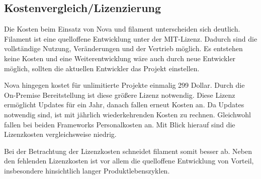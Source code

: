 \subsection{Kostenvergleich/Lizenzierung}
Die Kosten beim Einsatz von Nova und filament unterscheiden sich deutlich.
Filament ist eine quelloffene Entwicklung unter der MIT-Lizenz.
Dadurch sind die vollständige Nutzung, Veränderungen und der Vertrieb möglich.
Es entstehen keine Kosten und eine Weiterentwicklung wäre auch durch neue Entwickler möglich, sollten die aktuellen Entwickler das Projekt einstellen.

Nova hingegen kostet für unlimitierte Projekte einmalig 299 Dollar.
Durch die On-Premise Bereitstellung ist diese größere Lizenz notwendig.
Diese Lizenz ermöglicht Updates für ein Jahr, danach fallen erneut Kosten an.
Da Updates notwendig sind, ist mit jährlich wiederkehrenden Kosten zu rechnen.
Gleichwohl fallen bei beiden Frameworks Personalkosten an.
Mit Blick hierauf sind die Lizenzkosten vergleichsweise niedrig.

Bei der Betrachtung der Lizenzkosten schneidet filament somit besser ab.
Neben den fehlenden Lizenzkosten ist vor allem die quelloffene Entwicklung von Vorteil, insbesondere hinsichtlich langer Produktlebenszyklen.
